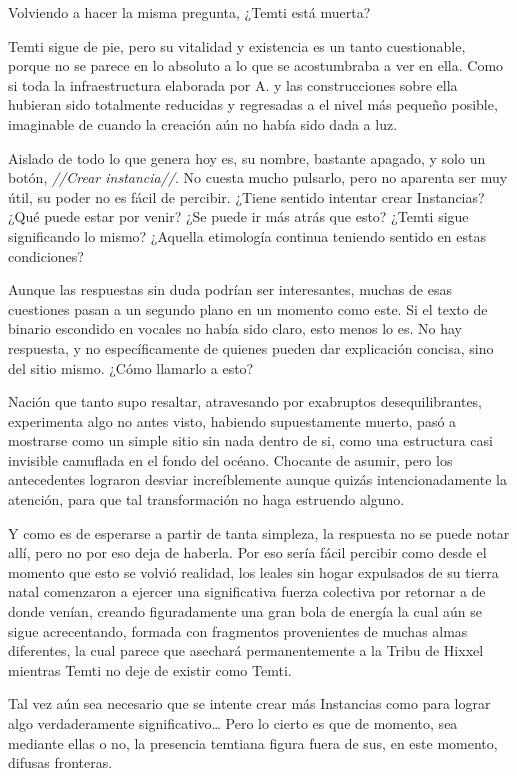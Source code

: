\documentclass[
  spanish,
]{book}
\begin{document}
Volviendo a hacer la misma pregunta, ¿Temti está muerta?

Temti sigue de pie, pero su vitalidad y existencia es un tanto cuestionable, porque no se parece en lo absoluto a lo que se acostumbraba a ver en ella. Como si toda la infraestructura elaborada por A. y las construcciones sobre ella hubieran sido totalmente reducidas y regresadas a el nivel más pequeño posible, imaginable de cuando la creación aún no había sido dada a luz.

Aislado de todo lo que genera hoy es, su nombre, bastante apagado, y solo un botón, \emph{//Crear instancia//}. No cuesta mucho pulsarlo, pero no aparenta ser muy útil, su poder no es fácil de percibir. ¿Tiene sentido intentar crear Instancias? ¿Qué puede estar por venir? ¿Se puede ir más atrás que esto? ¿Temti sigue significando lo mismo? ¿Aquella etimología continua teniendo sentido en estas condiciones?

Aunque las respuestas sin duda podrían ser interesantes, muchas de esas cuestiones pasan a un segundo plano en un momento como este. Si el texto de binario escondido en vocales no había sido claro, esto menos lo es. No hay respuesta, y no específicamente de quienes pueden dar explicación concisa, sino del sitio mismo. ¿Cómo llamarlo a esto?

Nación que tanto supo resaltar, atravesando por exabruptos desequilibrantes, experimenta algo no antes visto, habiendo supuestamente muerto, pasó a mostrarse como un simple sitio sin nada dentro de si, como una estructura casi invisible camuflada en el fondo del océano. Chocante de asumir, pero los antecedentes lograron desviar increíblemente aunque quizás intencionadamente la atención, para que tal transformación no haga estruendo alguno.

Y como es de esperarse a partir de tanta simpleza, la respuesta no se puede notar allí, pero no por eso deja de haberla. Por eso sería fácil percibir como desde el momento que esto se volvió realidad, los leales sin hogar expulsados de su tierra natal comenzaron a ejercer una significativa fuerza colectiva por retornar a de donde venían, creando figuradamente una gran bola de energía la cual aún se sigue acrecentando, formada con fragmentos provenientes de muchas almas diferentes, la cual parece que asechará permanentemente a la Tribu de Hixxel mientras Temti no deje de existir como Temti.

Tal vez aún sea necesario que se intente crear más Instancias como para lograr algo verdaderamente significativo\ldots{} Pero lo cierto es que de momento, sea mediante ellas o no, la presencia temtiana figura fuera de sus, en este momento, difusas fronteras.
\end{document}
